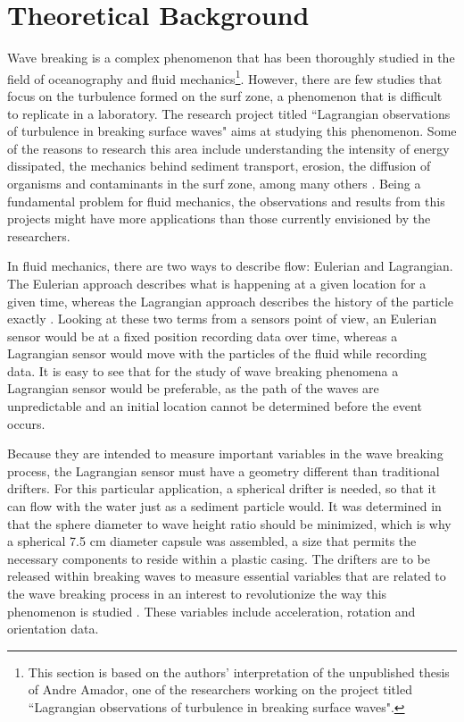 \section{Theoretical Background}

Wave breaking is a complex phenomenon that has been thoroughly studied in the field of oceanography and fluid mechanics\footnote{This section is based on the authors' interpretation of the unpublished thesis of Andre Amador, one of the researchers working on the project titled ``Lagrangian observations of turbulence in breaking
surface waves".}.  However, there are few studies that focus on the turbulence formed on the surf zone, a phenomenon that is difficult to replicate in a laboratory.  The research project titled ``Lagrangian observations of turbulence in breaking surface waves" aims at studying this phenomenon.  Some of the reasons to research this area include understanding the intensity of energy dissipated, the mechanics behind sediment transport, erosion, the diffusion of organisms and contaminants in the surf zone, among many others \cite{Amador2012}.  Being a fundamental problem for fluid mechanics, the observations and results from this projects might have more applications than those currently envisioned by the researchers.

In fluid mechanics, there are two ways to describe flow: Eulerian and Lagrangian.  The Eulerian approach describes what is happening at a given location for a given time, whereas the Lagrangian approach describes the history of the particle exactly \cite{Granger1985}.  Looking at these two terms from a sensors point of view, an Eulerian sensor would be at a fixed position recording data over time, whereas a Lagrangian sensor would move with the particles of the fluid while recording data.  It is easy to see that for the study of wave breaking phenomena a Lagrangian sensor would be preferable, as the path of the waves are unpredictable and an initial location cannot be determined before the event occurs.

Because they are intended to measure important variables in the wave breaking process, the Lagrangian sensor must have a geometry different than traditional drifters.  For this particular application, a spherical drifter is needed, so that it can flow with the water just as a sediment particle would.  It was determined in \cite{Canals2012} that the sphere diameter to wave height ratio should be minimized, which is why a spherical 7.5 cm diameter capsule was assembled, a size that permits the necessary components to reside within a plastic casing. The drifters are to be released within breaking waves to measure essential variables that are related to the wave breaking process in an interest to revolutionize the way this phenomenon is studied \cite{Canals2012}.  These variables include acceleration, rotation and orientation data.

